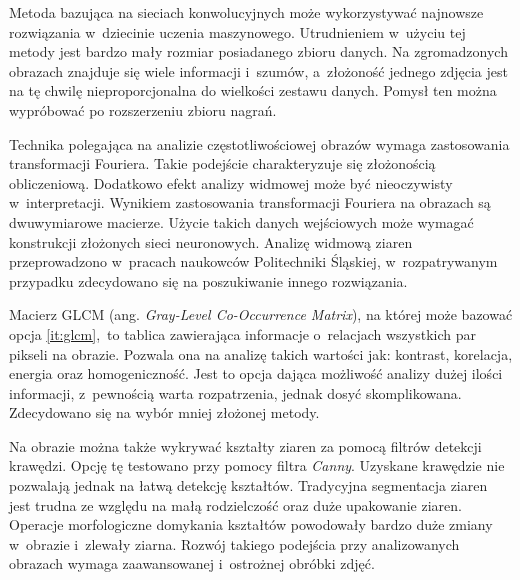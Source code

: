 Metoda bazująca na sieciach konwolucyjnych może wykorzystywać najnowsze
rozwiązania w~dziecinie uczenia maszynowego.
Utrudnieniem w~użyciu tej metody jest bardzo mały rozmiar posiadanego zbioru
danych.
Na zgromadzonych obrazach znajduje się wiele informacji i~szumów, a~złożoność
jednego zdjęcia jest na tę chwilę nieproporcjonalna do wielkości zestawu danych.
Pomysł ten można wypróbować po rozszerzeniu zbioru nagrań.

Technika polegająca na analizie częstotliwościowej obrazów wymaga zastosowania
transformacji Fouriera.
Takie podejście charakteryzuje się złożonością obliczeniową.
Dodatkowo efekt analizy widmowej może być nieoczywisty w~interpretacji.
Wynikiem zastosowania transformacji Fouriera na obrazach są dwuwymiarowe
macierze.
Użycie takich danych wejściowych może wymagać konstrukcji złożonych sieci
neuronowych.
Analizę widmową ziaren przeprowadzono w~pracach naukowców Politechniki Śląskiej,
w~rozpatrywanym przypadku zdecydowano się na poszukiwanie innego rozwiązania.

Macierz GLCM (ang. \textit{Gray-Level Co-Occurrence Matrix}), na której może
bazować opcja \ref{it:glcm},~to tablica zawierająca informacje o~relacjach
wszystkich par pikseli na obrazie.
Pozwala ona na analizę takich wartości jak: kontrast, korelacja, energia oraz
homogeniczność.
Jest to opcja dająca możliwość analizy dużej ilości informacji, z~pewnością
warta rozpatrzenia, jednak dosyć skomplikowana.
Zdecydowano się na wybór mniej złożonej metody.

Na obrazie można także wykrywać kształty ziaren za pomocą filtrów detekcji
krawędzi.
Opcję tę testowano przy pomocy filtra \emph{Canny}.
Uzyskane krawędzie nie pozwalają jednak na łatwą detekcję kształtów.
Tradycyjna segmentacja ziaren jest trudna ze względu na małą rodzielczość oraz
duże upakowanie ziaren.
Operacje morfologiczne domykania kształtów powodowały bardzo duże zmiany
w~obrazie i~zlewały ziarna.
Rozwój takiego podejścia przy analizowanych obrazach wymaga zaawansowanej
i~ostrożnej obróbki zdjęć.

